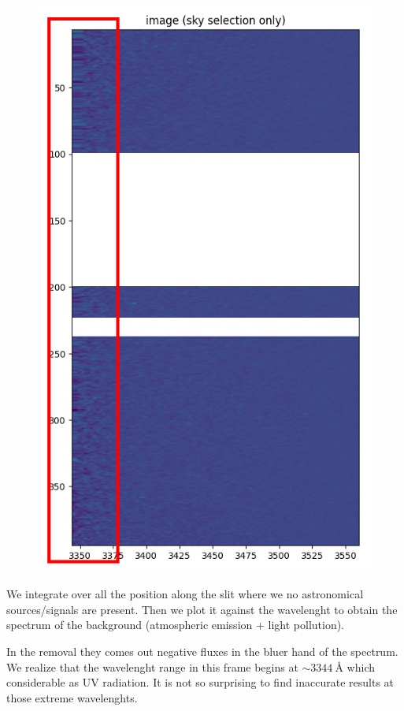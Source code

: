 \documentclass{article}
\begin{document}
\begin{figure}[h!]
	\centering
	\includegraphics[width=.35\textwidth, angle=90]{10_det}
\end{figure}
We integrate over all the position along the slit where we no astronomical sources/signals are present. Then we plot it against the wavelenght to obtain the spectrum of the background (atmospheric emission + light pollution).

In the removal they comes out negative fluxes in the bluer hand of the spectrum. We realize that the wavelenght range in this frame begins at $\sim\SI{3344}{\angstrom}$ which considerable as UV radiation. It is not so surprising to find inaccurate results at those extreme wavelenghts.
\end{document}
